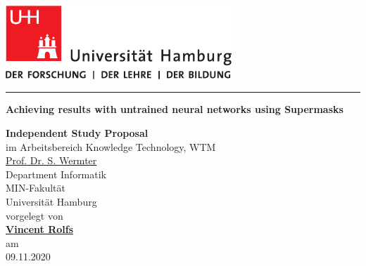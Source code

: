 \documentclass[12pt,final,twoside]{article}
\author{\trauthor}
\makeatletter
\newcommand{\trtitle}{Achieving results with untrained neural networks using Supermasks}
\newcommand{\trtype}{Independent Study Proposal}
\newcommand{\trauthor}{Vincent Rolfs}
\newcommand{\trauthortitle}{} %
\newcommand{\tremail}{vincent.rolfs@studium.uni-hamburg.de}
\newcommand{\trgutachterA}{\href{mailto:wermter@informatik.uni-hamburg.de}{Prof. Dr. S. Wermter}}
\newcommand{\trfach}{Knowledge Technology, WTM}
\newcommand{\trdate}{09.11.2020}
\theoremstyle{plain}
\theoremstyle{definition}
\theoremstyle{remark}
\theoremstyle{named}
\makeatother
\begin{document}
\renewcommand{\headheight}{14.5pt}      %

\thispagestyle{empty}
\fancyhead[LO,RE]{}                     %


\begin{titlepage}
    \begin{flushleft}
        \includegraphics[width=85mm]{uhhLogoL.pdf}\\
    \end{flushleft}
    \rule{\textwidth}{0.4pt}
        \newline
        \vspace{2.0cm}
        \begin{center}
          \LARGE \textbf{\trtitle}
        \end{center}
    \vspace{2.0cm}
    \begin{center}
      \textbf{\trtype}\\
      im Arbeitsbereich \trfach\\
      \trgutachterA\medskip\\
      Department Informatik\\
      MIN-Fakult\"at\\
      Universit\"at Hamburg \\[0.5cm]
      vorgelegt von \\
      \textbf{\trauthortitle\href{mailto:\tremail}{\trauthor}}\\
      am\\
      \trdate
    \end{center}

\end{titlepage}
\end{document}
